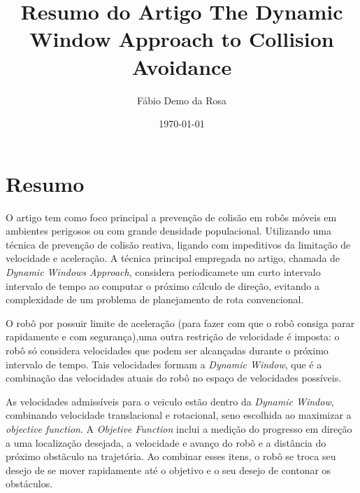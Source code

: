 \documentclass[12pt, a4paper]{article}
\begin{document}
\title{Resumo do Artigo The Dynamic Window Approach to Collision Avoidance}
\author{Fábio Demo da Rosa}
\date{\today}

\maketitle

\section{Resumo}
	O artigo tem como foco principal a prevenção de colisão em robôs móveis em ambientes perigosos ou com grande densidade populacional. Utilizando uma técnica de prevenção de colisão reativa, ligando com impeditivos da limitação de velocidade e aceleração.
	A técnica principal empregada no artigo, chamada de \textit{Dynamic Windows Approach}, considera periodicamete um curto intervalo intervalo de tempo ao computar o próximo cálculo de direção, evitando a complexidade de um problema de planejamento de rota convencional.

	O robô por possuir limite de aceleração (para fazer com que o robô consiga parar rapidamente e com segurança),uma outra restrição de velocidade é imposta: o robô só considera velocidades que podem ser alcançadas durante o próximo intervalo de tempo. 
	Tais velocidades formam a \textit{Dynamic Window}, que é a combinação das velocidades atuais do robô no espaço de velocidades possíveis.

	As velocidades admissíveis para o veiculo estão dentro da \textit{Dynamic Window}, combinando velocidade translacional e rotacional, seno escolhida ao maximizar a \textit{objective function}. A \textit{Objetive Function} inclui a medição do progresso em direção a uma localização desejada, a velocidade e avanço do robô e a distância do próximo obstãculo na trajetória.
	Ao combinar esses itens, o robô se troca seu desejo de se mover rapidamente até o objetivo e o seu desejo de contonar os obstáculos.
\end{document}
